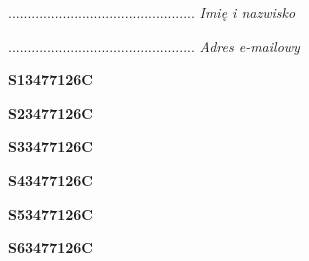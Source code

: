 \begin{turn}{90}\begin{minipage}{\linewidth} \vspace{20mm} ................................................  \textit{Imię i nazwisko}\end{minipage}\end{turn}

\begin{turn}{90}\begin{minipage}{\linewidth} \vspace{20mm} ................................................  \textit{Adres e-mailowy}\end{minipage}\end{turn}

\begin{turn}{90}\huge \begin{minipage}{\linewidth} \vspace{10mm}\textbf{S13477126C}\end{minipage}\end{turn}

\begin{turn}{90}\huge \begin{minipage}{\linewidth} \vspace{10mm}\textbf{S23477126C}\end{minipage}\end{turn}

\begin{turn}{90}\huge \begin{minipage}{\linewidth} \vspace{10mm}\textbf{S33477126C}\end{minipage}\end{turn}

\begin{turn}{90}\huge \begin{minipage}{\linewidth} \vspace{10mm}\textbf{S43477126C}\end{minipage}\end{turn}

\begin{turn}{90}\huge \begin{minipage}{\linewidth} \vspace{10mm}\textbf{S53477126C}\end{minipage}\end{turn}

\begin{turn}{90}\huge \begin{minipage}{\linewidth} \vspace{10mm}\textbf{S63477126C}\end{minipage}\end{turn}

